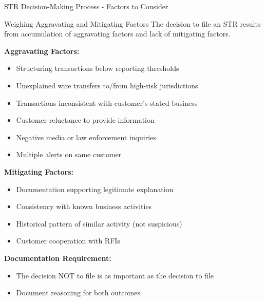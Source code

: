 \documentclass[11pt,a4paper]{beamer}
\begin{document}
	\begin{frame}{STR Decision-Making Process - Factors to Consider}
		\begin{block}{Weighing Aggravating and Mitigating Factors}
			The decision to file an STR results from accumulation of aggravating factors and lack of mitigating factors.
		\end{block}
		\textbf{Aggravating Factors:}
		\begin{itemize}
			\item Structuring transactions below reporting thresholds
			\item Unexplained wire transfers to/from high-risk jurisdictions
			\item Transactions inconsistent with customer's stated business
			\item Customer reluctance to provide information
			\item Negative media or law enforcement inquiries
			\item Multiple alerts on same customer
		\end{itemize}
		\textbf{Mitigating Factors:}
		\begin{itemize}
			\item Documentation supporting legitimate explanation
			\item Consistency with known business activities
			\item Historical pattern of similar activity (not suspicious)
			\item Customer cooperation with RFIs
		\end{itemize}
		\textbf{Documentation Requirement:}
		\begin{itemize}
			\item The decision NOT to file is as important as the decision to file
			\item Document reasoning for both outcomes
		\end{itemize}
	\end{frame}
	
\end{document}
